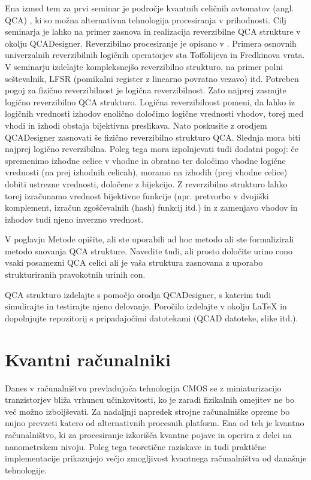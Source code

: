 Ena izmed tem za prvi seminar je področje kvantnih celičnih avtomatov (angl. QCA) \cite{lent1993, tougaw1994, lent1997, cowburn2000}, ki so možna alternativna tehnologija procesiranja v prihodnosti. Cilj seminarja je lahko na primer zasnova in realizacija reverzibilne QCA strukture v okolju QCADesigner. Reverzibilno procesiranje je opisano v \cite{toffoli1980, mittr2011, frank2017}. Primera osnovnih univerzalnih reverzibilnih logičnih operatorjev sta Toffolijeva in Fredkinova vrata. V seminarju izdelajte kompleksnejšo reverzibilno strukturo, na primer polni seštevalnik, LFSR (pomikalni register z linearno povratno vezavo) itd. Potreben pogoj za fizično reverzibilnost je logična reverzibilnost. Zato najprej zasnujte logično reverzibilno QCA strukturo. Logična reverzibilnost pomeni, da lahko iz logičnih vrednosti izhodov enolično določimo logične vrednosti vhodov, torej med vhodi in izhodi obstaja bijektivna preslikava. Nato poskusite z orodjem QCADesigner zasnovati še fizično reverzibilno strukturo QCA. Slednja mora biti najprej logično reverzibilna. Poleg tega mora izpolnjevati tudi dodatni pogoj: če spremenimo izhodne celice v vhodne in obratno ter določimo vhodne logične vrednosti (na prej izhodnih celicah), moramo na izhodih (prej vhodne celice) dobiti ustrezne vrednosti, določene z bijekcijo. Z reverzibilno strukturo lahko torej izračunamo vrednost bijektivne funkcije (npr. pretvorbo v dvojiški komplement, izračun zgoščevalnih (hash) funkcij itd.) in z zamenjavo vhodov in izhodov tudi njeno inverzno vrednost.

V poglavju Metode opišite, ali ste uporabili ad hoc metodo ali ste formalizirali metodo snovanja QCA strukture. Navedite tudi, ali prosto določite urino cono vsaki posamezni QCA celici ali je vaša struktura zasnovana z uporabo strukturiranih pravokotnih urinih con.

QCA strukturo izdelajte s pomočjo orodja QCADesigner, s katerim tudi simulirajte in testirajte njeno delovanje. Poročilo izdelajte v okolju LaTeX in dopolnjujte repozitorij s pripadajočimi datotekami (QCAD datoteke, slike itd.).



\newpage
\section*{Kvantni računalniki}
\label{g00:sec:qc}

Danes v računalništvu prevladujoča tehnologija CMOS se z miniaturizacijo tranzistorjev bliža vrhuncu učinkovitosti, ko je zaradi fizikalnih omejitev ne bo več možno izboljševati. Za nadaljnji napredek strojne računalniške opreme bo nujno prevzeti katero od alternativnih procesnih platform. Ena od teh je kvantno računalništvo, ki za procesiranje izkorišča kvantne pojave in operira z delci na nanometrskem nivoju. Poleg tega teoretične raziskave in tudi praktične implementacije prikazujejo večjo zmogljivost kvantnega računalništva od današnje tehnologije.

